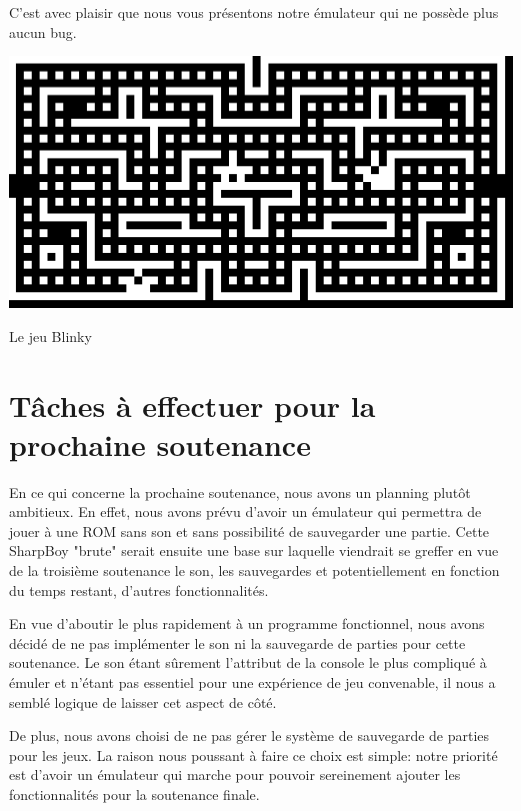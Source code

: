 \documentclass[12pt, a4paper]{article}
\begin{document}
C'est avec plaisir que nous vous présentons notre émulateur qui ne possède plus aucun bug.

\bigskip
\begin{center}
\includegraphics[width = 14.5cm]{chip8cap1.PNG}
\caption{Le jeu Blinky}
\end{center}
    




\pagebreak

\section{Tâches à effectuer pour la prochaine soutenance}

En ce qui concerne la prochaine soutenance, nous avons un planning plutôt ambitieux. En effet, nous avons prévu d'avoir un émulateur qui permettra de jouer à une ROM sans son et sans possibilité de sauvegarder une partie. Cette SharpBoy "brute" serait ensuite une base sur laquelle viendrait se greffer en vue de la troisième soutenance le son, les sauvegardes et potentiellement en fonction du temps restant, d'autres fonctionnalités.   

En vue d'aboutir le plus rapidement à un programme fonctionnel, nous avons décidé de ne pas implémenter le son ni la sauvegarde de parties pour cette soutenance. Le son étant sûrement l'attribut de la console le plus compliqué à émuler et n'étant pas essentiel pour une expérience de jeu convenable, il nous a semblé logique de laisser cet aspect de côté.

De plus, nous avons choisi de ne pas gérer le système de sauvegarde de parties pour les jeux. La raison nous poussant à faire ce choix est simple: notre priorité est d'avoir un émulateur qui marche pour pouvoir sereinement ajouter les fonctionnalités pour la soutenance finale.
\end{document}
